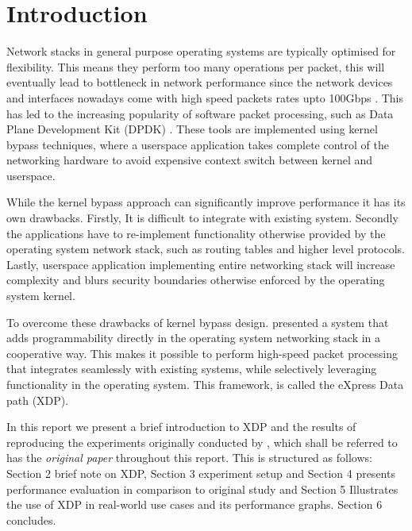 \documentclass[12pt,titlepage]{article}
\begin{document}


\doublespacing
\tableofcontents
\singlespacing

\newpage

\doublespacing


\section{Introduction}

Network stacks in general purpose operating systems are typically optimised for flexibility. 
This means they perform too many operations per packet, this will eventually lead to bottleneck in network performance  since the network devices and interfaces nowadays come with high speed packets rates upto 100Gbps . This has led to the increasing popularity of software packet processing, such as Data Plane Development Kit (DPDK) \cite{dpdk}. These tools are implemented using kernel bypass techniques, where a userspace application takes complete control of the networking hardware to avoid expensive context switch between kernel and userspace. 

While the kernel bypass approach can significantly improve performance it has its own drawbacks. Firstly, It is difficult to integrate with existing system. Secondly the applications have to re-implement functionality otherwise provided by the operating system network stack, 
such as routing tables and higher level protocols. Lastly, userspace application implementing entire networking stack will increase complexity and blurs security boundaries otherwise enforced by the operating system kernel. 

To overcome these drawbacks of kernel bypass design. \citet{xdp} presented a system that adds programmability directly in the operating system networking stack in a cooperative way. This makes it possible to perform high-speed packet processing that integrates seamlessly with existing systems, while selectively leveraging functionality in the operating system. This framework, is called the eXpress Data path (XDP). 

In this report we present a brief introduction to XDP and the results of reproducing the experiments originally conducted by \citet*{xdp}, which shall be referred to has the \textit{original paper} throughout this report.
This is structured as follows: Section 2 brief note on XDP, Section 3 experiment setup and Section 4 presents performance evaluation in comparison to original study and Section 5 Illustrates the use of XDP in real-world use cases and its performance graphs. Section 6 concludes.
\end{document}
